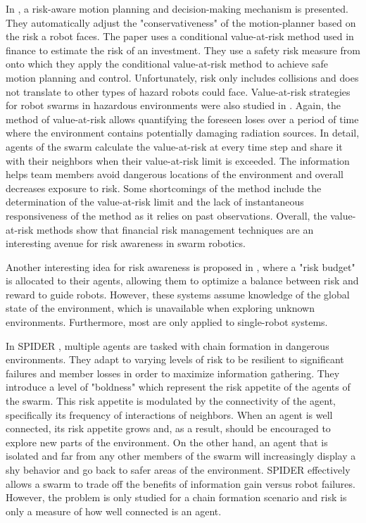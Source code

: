 In \cite{hakobyan2019risk}, a risk-aware motion planning and decision-making mechanism is presented. They automatically adjust the "conservativeness" of the motion-planner based on the risk a robot faces. The paper uses a conditional value-at-risk method used in finance to estimate the risk of an investment. They use a safety risk measure from \cite{samuelson2018safety} onto which they apply the conditional value-at-risk method to achieve safe motion planning and control. Unfortunately, risk only includes collisions and does not translate to other types of hazard robots could face. Value-at-risk strategies for robot swarms in hazardous environments were also studied in \cite{hunt2021value}. Again, the method of value-at-risk allows quantifying the foreseen loses over a period of time where the environment contains potentially damaging radiation sources. In detail, agents of the swarm calculate the value-at-risk at every time step and share it with their neighbors when their value-at-risk limit is exceeded. The information helps team members avoid dangerous locations of the environment and overall decreases exposure to risk. Some shortcomings of the method include the determination of the value-at-risk limit and the lack of instantaneous responsiveness of the method as it relies on past observations. Overall, the value-at-risk methods show that financial risk management techniques are an interesting avenue for risk awareness in swarm robotics.

Another interesting idea for risk awareness is proposed in \cite{ono2008efficient,vitus2011feedback}, where a "risk budget" is allocated to their agents, allowing them to optimize a balance between risk and reward to guide robots. However, these systems assume knowledge of the global state of the environment, which is unavailable when exploring unknown environments. Furthermore, most are only applied to single-robot systems. 

In SPIDER \cite{hunt2020spider}, multiple agents are tasked with chain formation in dangerous environments. They adapt to varying levels of risk to be resilient to significant failures and member losses in order to maximize information gathering. They introduce a level of "boldness" which represent the risk appetite of the agents of the swarm. This risk appetite is modulated by the connectivity of the agent, specifically its frequency of interactions of neighbors. When an agent is well connected, its risk appetite grows and, as a result, should be encouraged to explore new parts of the environment. On the other hand, an agent that is isolated and far from any other members of the swarm will increasingly display a shy behavior and go back to safer areas of the environment. SPIDER effectively allows a swarm to trade off the benefits of information gain versus robot failures. However, the problem is only studied for a chain formation scenario and risk is only a measure of how well connected is an agent.  






